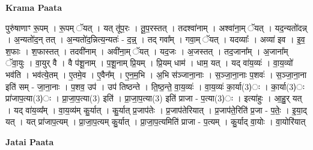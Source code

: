 \documentclass[17pt]{extarticle}
\begin{document}
\textbf{Krama Paata} \newline

पुरु॑षाणाꣳ रू॒पम् । रू॒पम् ॅयत् । यत् तू॑प॒रः । तू॒प॒रस्तत् । तदश्वा॑नाम् । अश्वा॑ना॒म् ॅयत् । यद॒न्यतो॑दन्न् । अ॒न्यतो॑द॒न् तत् । अ॒न्यतो॑द॒न्नित्य॒न्यतः॑ - द॒न्न्॒ । तद् गवा᳚म् । गवा॒म् ॅयत् । यदव्याः᳚ । अव्या॑ इव । इ॒व॒ श॒फाः । श॒फास्तत् । तदवी॑नाम् । अवी॑ना॒म् ॅयत् । यद॒जः । अ॒जस्तत् । तद॒जाना᳚म् । अ॒जाना᳚म् ॅवा॒युः । वा॒युर् वै । वै प॑शू॒नाम् । प॒शू॒नाम् प्रि॒यम् । प्रि॒यम् धाम॑ । धाम॒ यत् । यद् वा॑य॒व्यः॑ । वा॒य॒व्यो॑ भव॑ति । भव॑त्ये॒तम् । ए॒तमे॒व । ए॒वैन᳚म् । ए॒न॒म॒भि । अ॒भि स॑ञ्जाना॒नाः । स॒ञ्जा॒ना॒नाः प॒शवः॑ । स॒ञ्जा॒ना॒ना इति॑ सम् - जा॒ना॒नाः । प॒शव॒ उप॑ । उप॑ तिष्ठन्ते । ति॒ष्ठ॒न्ते॒ वा॒य॒व्यः॑ । वा॒य॒व्यः॑ का॒र्या(3)ः । का॒र्या(3)ः प्रा॑जाप॒त्या(3)ः । प्रा॒जा॒प॒त्या(3) इति॑ । प्रा॒जा॒प॒त्या(3) इति॑ प्राजा - प॒त्या(3)ः । इत्या॑हुः । आ॒हु॒र् यत् । यद् वा॑य॒व्य᳚म् । वा॒य॒व्य॑म् कु॒र्यात् । कु॒र्यात् प्र॒जाप॑तेः । प्र॒जाप॑तेरियात् । प्र॒जाप॑ते॒रिति॑ प्र॒जा - प॒तेः॒ । इ॒या॒द् यत् । यत् प्रा॑जाप॒त्यम् । प्रा॒जा॒प॒त्यम् कु॒र्यात् । प्रा॒जा॒प॒त्यमिति॑ प्राजा - प॒त्यम् । कु॒र्याद् वा॒योः । वा॒योरि॑यात् \newline

\textbf{Jatai Paata} \newline
\end{document}
